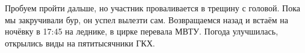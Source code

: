 Пробуем пройти дальше, но участник проваливается в трещину с головой. Пока мы закручивали бур, он успел вылезти сам. Возвращаемся назад и встаём на ночёвку в 17:45 на леднике, в цирке перевала МВТУ. Погода улучшилась, открылись виды на пятитысячники ГКХ.












    \FloatBarrier

